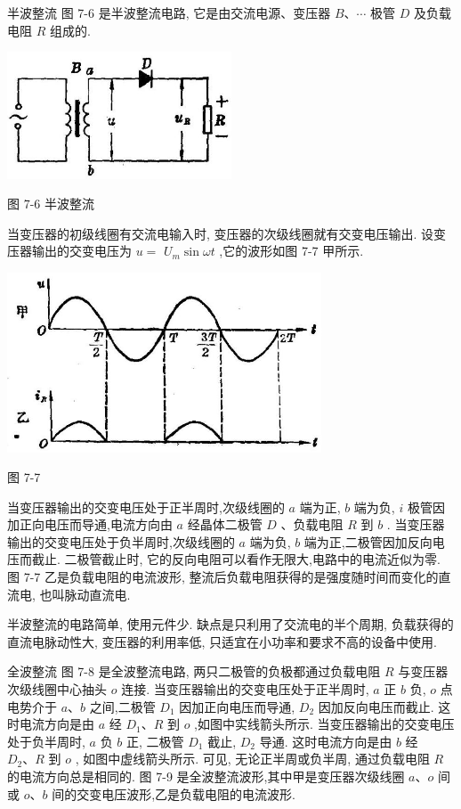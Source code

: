 \documentclass[10pt]{article}
\begin{document}
半波整流 图 7-6 是半波整流电路, 它是由交流电源、变压器 \(B\text{、}\cdots\) 极管 \(D\) 及负载电阻 \(R\) 组成的.

\begin{center}
\includegraphics[max width=0.5\textwidth]{images/01913056-1f15-74d8-9184-9aab52c9d66b_225_373965.jpg}
\end{center}

图 7-6 半波整流

当变压器的初级线圈有交流电输入时, 变压器的次级线圈就有交变电压输出. 设变压器输出的交变电压为 \(u =\) \({U}_{m}\sin {\omega t}\) ,它的波形如图 7-7 甲所示.

\begin{center}
\includegraphics[max width=0.7\textwidth]{images/01913056-1f15-74d8-9184-9aab52c9d66b_225_536425.jpg}
\end{center}

图 7-7

当变压器输出的交变电压处于正半周时,次级线圈的 \(a\) 端为正, \(b\) 端为负, \(i\) 极管因加正向电压而导通,电流方向由 \(a\) 经晶体二极管 \(D\) 、负载电阻 \(R\) 到 \(b\) . 当变压器输出的交变电压处于负半周时,次级线圈的 \(a\) 端为负, \(b\) 端为正,二极管因加反向电压而截止. 二极管截止时, 它的反向电阻可以看作无限大,电路中的电流近似为零. 图 7-7 乙是负载电阻的电流波形, 整流后负载电阻获得的是强度随时间而变化的直流电, 也叫脉动直流电.

半波整流的电路简单, 使用元件少. 缺点是只利用了交流电的半个周期, 负载获得的直流电脉动性大, 变压器的利用率低, 只适宜在小功率和要求不高的设备中使用.

全波整流 图 7-8 是全波整流电路, 两只二极管的负极都通过负载电阻 \(R\) 与变压器次级线圈中心抽头 \(o\) 连接. 当变压器输出的交变电压处于正半周时, \(a\) 正 \(b\) 负, \(o\) 点电势介于 \(a\text{、}b\) 之间,二极管 \({D}_{1}\) 因加正向电压而导通, \({D}_{2}\) 因加反向电压而截止. 这时电流方向是由 \(a\) 经 \({D}_{1}\text{、}R\) 到 \(o\) ,如图中实线箭头所示. 当变压器输出的交变电压处于负半周时, \(a\) 负 \(b\) 正, 二极管 \({D}_{1}\) 截止, \({D}_{2}\) 导通. 这时电流方向是由 \(b\) 经 \({D}_{2}\text{、}R\) 到 \(o\) , 如图中虚线箭头所示. 可见, 无论正半周或负半周, 通过负载电阻 \(R\) 的电流方向总是相同的. 图 7-9 是全波整流波形,其中甲是变压器次级线圈 \(a\text{、}o\) 间或 \(o\text{、}b\) 间的交变电压波形,乙是负载电阻的电流波形.
\end{document}
